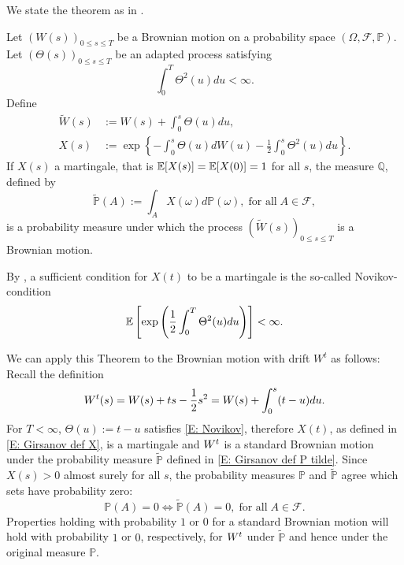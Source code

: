 We state the theorem as in \cite[Theorem 4.2.2, p.66]{Lamberton1996}.
\begin{theorem}[Girsanov] \label{T: Girsanov}
	Let $(W(s))_{0 \leq s \leq T}$ be a Brownian motion on a probability space $(\Omega, \mathcal{F}, \mathbb{P})$.
	Let $(\Theta(s))_{0 \leq s \leq T}$ be an adapted process satisfying
	\begin{equation} \label{E: Girsanov cond Theta}
	\int_{0}^{T} \Theta^2(u)du < \infty.
	\end{equation}
	Define
	\begin{align}
		\tilde{W}(s) &:= W(s) + \int_0^s \Theta(u)du, \label{E: Girsanov def W tilde} \\ 
		X(s) &:= \exp \left\{ -\int_{0}^{s} \Theta(u) dW(u) - \frac{1}{2} \int_0^s \Theta^2(u)du \right\}. \label{E: Girsanov def X}
	\end{align}
	If $X(s)$ a martingale, that is $\mathbb{E}[X(s)] = \mathbb{E}[X(0)] = 1$ for all $s$,
	the measure $\mathbb{Q}$, defined by
	\begin{equation} \label{E: Girsanov def P tilde}
	\tilde{\mathbb{P}}(A) := \int_A X(\omega) d\mathbb{P}(\omega), \; \text{for all} \; A \in \mathcal{F},
	\end{equation}
	is a probability measure under which the process 
	$(\tilde{W}(s))_{0 \leq s \leq T}$
	is a Brownian motion.
\end{theorem}

By \cite[Remark 4.2.3, p. 66]{Lamberton2000}, a sufficient condition for $X(t)$ to be a martingale is the so-called Novikov-condition
\begin{equation} \label{E: Novikov}
\mathbb{E} \left[  \exp \left( \frac{1}{2} \int_{0}^{T} \Theta^2(u)du \right)  \right] < \infty.
\end{equation}

We can apply this Theorem to the Brownian motion with drift $W^t$ as follows:
Recall the definition
\begin{equation}
W^t(s) = W(s) + ts - \frac{1}{2} s^2 = W(s) + \int_0^s (t-u)du.
\end{equation}
For $T<\infty$, $\Theta(u) := t-u$ satisfies \eqref{E: Novikov},
therefore $X(t)$, as defined in \eqref{E: Girsanov def X}, is a martingale and
$W^t$ is a standard Brownian motion under the probability measure $\tilde{\mathbb{P}}$ defined in \eqref{E: Girsanov def P tilde}.
Since $X(s) > 0$ almost surely for all $s$, the probability measures $\mathbb{P}$ and $\tilde{\mathbb{P}}$ agree which sets have probability zero:
\begin{equation} \label{E: P0 = Q0}
\mathbb{P}(A) = 0 \iff \tilde{\mathbb{P}}(A) = 0, \; \text{for all} \; A \in \mathcal{F}.
\end{equation}
Properties holding with probability $1$ or $0$ for a standard Brownian motion will hold with probability $1$ or $0$, respectively,
for $W^t$ under $\tilde{\mathbb{P}}$ and hence under the original measure $\mathbb{P}$.


